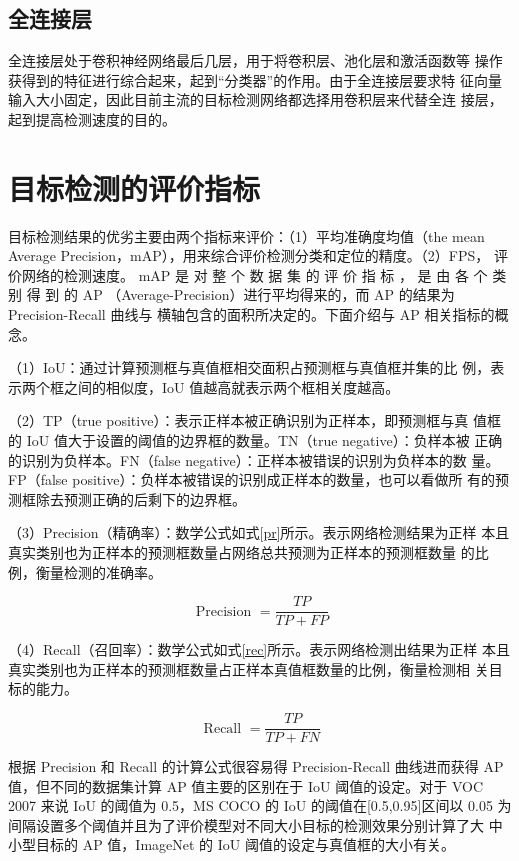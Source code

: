 \subsection{全连接层}
全连接层处于卷积神经网络最后几层，用于将卷积层、池化层和激活函数等
操作获得到的特征进行综合起来，起到“分类器”的作用。由于全连接层要求特
征向量输入大小固定，因此目前主流的目标检测网络都选择用卷积层来代替全连
接层，起到提高检测速度的目的。

\section{目标检测的评价指标}
目标检测结果的优劣主要由两个指标来评价：（1）平均准确度均值（the mean
Average Precision，mAP），用来综合评价检测分类和定位的精度。（2）FPS，
评价网络的检测速度。
mAP 是 对 整 个 数 据 集 的 评 价 指 标 ， 是 由 各 个 类 别 得 到 的 AP
（Average-Precision）进行平均得来的，而 AP 的结果为 Precision-Recall 曲线与
横轴包含的面积所决定的。下面介绍与 AP 相关指标的概念。

（1）IoU：通过计算预测框与真值框相交面积占预测框与真值框并集的比
例，表示两个框之间的相似度，IoU 值越高就表示两个框相关度越高。

（2）TP（true positive）：表示正样本被正确识别为正样本，即预测框与真
值框的 IoU 值大于设置的阈值的边界框的数量。TN（true negative）：负样本被
正确的识别为负样本。FN（false negative）：正样本被错误的识别为负样本的数
量。FP（false positive）：负样本被错误的识别成正样本的数量，也可以看做所
有的预测框除去预测正确的后剩下的边界框。

（3）Precision（精确率）：数学公式如式\ref{pr}所示。表示网络检测结果为正样
本且真实类别也为正样本的预测框数量占网络总共预测为正样本的预测框数量
的比例，衡量检测的准确率。

\begin{equation}
     \text { Precision }=\frac{T P}{T P+F P}
    \label{pr}
\end{equation}

（4）Recall（召回率）：数学公式如式\ref{rec}所示。表示网络检测出结果为正样
本且真实类别也为正样本的预测框数量占正样本真值框数量的比例，衡量检测相
关目标的能力。

\begin{equation}
     \text { Recall }=\frac{T P}{T P+F N}
    \label{rec}
\end{equation}

根据 Precision 和 Recall 的计算公式很容易得 Precision-Recall 曲线进而获得
AP 值，但不同的数据集计算 AP 值主要的区别在于 IoU 阈值的设定。对于 VOC
2007 来说 IoU 的阈值为 0.5，MS COCO 的 IoU 的阈值在[0.5,0.95]区间以 0.05 为
间隔设置多个阈值并且为了评价模型对不同大小目标的检测效果分别计算了大
中小型目标的 AP 值，ImageNet 的 IoU 阈值的设定与真值框的大小有关。

